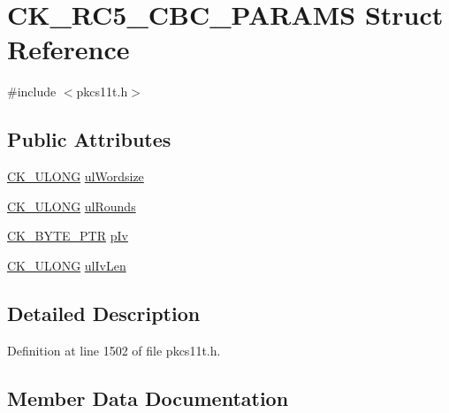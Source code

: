 \hypertarget{struct_c_k___r_c5___c_b_c___p_a_r_a_m_s}{}\section{C\+K\+\_\+\+R\+C5\+\_\+\+C\+B\+C\+\_\+\+P\+A\+R\+A\+MS Struct Reference}
\label{struct_c_k___r_c5___c_b_c___p_a_r_a_m_s}


{\ttfamily \#include $<$pkcs11t.\+h$>$}

\subsection*{Public Attributes}
\begin{DoxyCompactItemize}
\item 
\hyperlink{pkcs11t_8h_a35181858a3b7a0a81f49d180d8f446ef}{C\+K\+\_\+\+U\+L\+O\+NG} \hyperlink{struct_c_k___r_c5___c_b_c___p_a_r_a_m_s_a8c73bb58423c42d45a96a32c206c408a}{ul\+Wordsize}
\item 
\hyperlink{pkcs11t_8h_a35181858a3b7a0a81f49d180d8f446ef}{C\+K\+\_\+\+U\+L\+O\+NG} \hyperlink{struct_c_k___r_c5___c_b_c___p_a_r_a_m_s_aba2db9c3d541acf5bdd8b1ba6ff8699e}{ul\+Rounds}
\item 
\hyperlink{pkcs11t_8h_a3d7233a4077fbaf7ae76b64da0a62a21}{C\+K\+\_\+\+B\+Y\+T\+E\+\_\+\+P\+TR} \hyperlink{struct_c_k___r_c5___c_b_c___p_a_r_a_m_s_a1441cbb43877674445af7a863bf5ee39}{p\+Iv}
\item 
\hyperlink{pkcs11t_8h_a35181858a3b7a0a81f49d180d8f446ef}{C\+K\+\_\+\+U\+L\+O\+NG} \hyperlink{struct_c_k___r_c5___c_b_c___p_a_r_a_m_s_ac1636fd00784fd3994a40a4f1668a8f8}{ul\+Iv\+Len}
\end{DoxyCompactItemize}


\subsection{Detailed Description}


Definition at line 1502 of file pkcs11t.\+h.



\subsection{Member Data Documentation}
\mbox{\label{struct_c_k___r_c5___c_b_c___p_a_r_a_m_s_a1441cbb43877674445af7a863bf5ee39}} 
